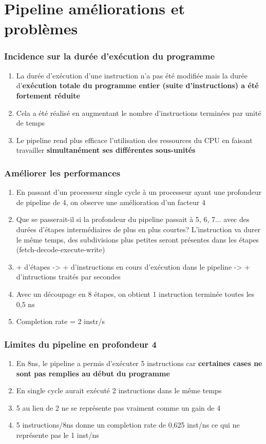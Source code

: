 \chapter{Pipeline améliorations et problèmes}
\subsection{Incidence sur la durée d'exécution du programme}
\begin{enumerate}
  \item La durée d'exécution d'une instruction n'a pas été modifiée mais la durée d'\textbf{exécution totale du programme entier (suite d'instructions) a été fortement réduite}
  \item Cela a été réalisé en augmentant le nombre d'instructions terminées par unité de temps
  \item Le pipeline rend plus efficace l'utilisation des ressources du CPU en faisant travailler \textbf{simultanément ses différentes sous-unités}
\end{enumerate}

\subsection{Améliorer les performances}
\begin{enumerate}
  \item En passant d'un processeur single cycle à un processeur ayant une profondeur de pipeline de 4, on observe une amélioration d'un facteur 4
  \item Que se passerait-il si la profondeur du pipeline passait à 5, 6, 7... avec des durées d'étapes intermédiaires de plus en plus courtes? L'instruction va durer le même temps, des subdivisions plus petites seront présentes dans les étapes (fetch-decode-execute-write)
  \item + d'étapes -> + d'instructions en cours d'exécution dans le pipeline -> + d'intructions traités par secondes
  \item Avec un découpage en 8 étapes, on obtient 1 instruction terminée toutes les 0,5 ns 
  \item Completion rate = 2 instr/s
\end{enumerate}

\subsection{Limites du pipeline en profondeur 4}
\begin{enumerate}
\item En 8ns, le pipeline a permis d'exécuter 5 instructions car \textbf{certaines cases ne sont pas remplies au début du programme}
\item En single cycle aurait exécuté 2 instructions dans le même temps
\item 5 au lieu de 2 ne se représente pas vraiment comme un gain de 4
\item 5 instructions/8ns donne un completion rate de 0,625 inst/ns ce qui ne représente pas le 1 inst/ns
\end{enumerate}

